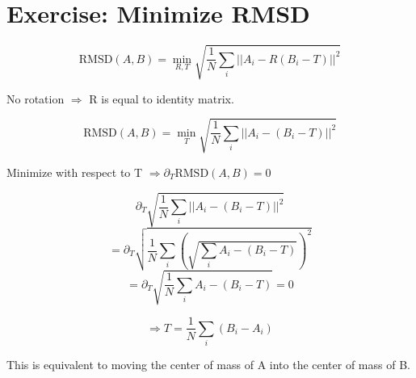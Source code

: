 \documentclass[11pt]{article}
\begin{document}
\date{\today}

\section{Exercise: Minimize RMSD}

\[ \textrm{RMSD}(A,B) = \min_{R,T} \sqrt{\frac{1}{N}\sum_i || A_i - R (B_i - T) ||^2 }\]

No rotation $\Rightarrow$ R is equal to identity matrix.

\[ \textrm{RMSD}(A,B) = \min_{T} \sqrt{\frac{1}{N}\sum_i || A_i - (B_i - T) ||^2 }\]

Minimize with respect to T $\Rightarrow \partial_T \textrm{RMSD}(A,B) = 0 $

\[ \partial_T \sqrt{\frac{1}{N}\sum_i || A_i - (B_i - T) ||^2} \]
\[ = \partial_T \sqrt{\frac{1}{N} \sum_i \left(\sqrt{\sum_i A_i - (B_i - T) }\right)^2} \]
\[ = \partial_T \sqrt{\frac{1}{N} \sum_i  A_i - (B_i - T)} = 0\]

\[ \Rightarrow T = \frac{1}{N} \sum_i (B_i - A_i) \]

This is equivalent to moving the center of mass of A into the center of mass of B.
\end{document}
